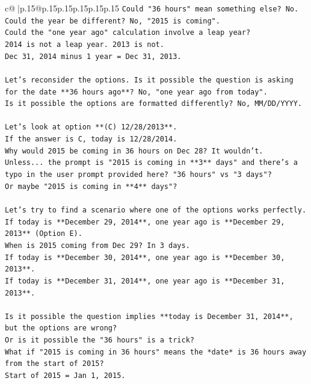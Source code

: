 \documentclass{article}
\begin{document}
{\begin{supertabular}{c@{$\;$}|p{.15\linewidth}@{}p{.15\linewidth}p{.15\linewidth}p{.15\linewidth}p{.15\linewidth}p{.15\linewidth}}
{{{\texttt{Could "36 hours" mean something else? No.} \\
\texttt{Could the year be different? No, "2015 is coming".} \\
\texttt{Could the "one year ago" calculation involve a leap year?} \\
\texttt{2014 is not a leap year. 2013 is not.} \\
\texttt{Dec 31, 2014 minus 1 year = Dec 31, 2013.} \\
\\ 
\texttt{Let's reconsider the options. Is it possible the question is asking for the date **36 hours ago**? No, "one year ago from today".} \\
\texttt{Is it possible the options are formatted differently? No, MM/DD/YYYY.} \\
\\ 
\texttt{Let's look at option **(C) 12/28/2013**.} \\
\texttt{If the answer is C, today is 12/28/2014.} \\
\texttt{Why would 2015 be coming in 36 hours on Dec 28? It wouldn't.} \\
\texttt{Unless... the prompt is "2015 is coming in **3** days" and there's a typo in the user prompt provided here? "36 hours" vs "3 days"?} \\
\texttt{Or maybe "2015 is coming in **4** days"?} \\
\\ 
\texttt{Let's try to find a scenario where one of the options works perfectly.} \\
\texttt{If today is **December 29, 2014**, one year ago is **December 29, 2013** (Option E).} \\
\texttt{When is 2015 coming from Dec 29? In 3 days.} \\
\texttt{If today is **December 30, 2014**, one year ago is **December 30, 2013**.} \\
\texttt{If today is **December 31, 2014**, one year ago is **December 31, 2013**.} \\
\\ 
\texttt{Is it possible the question implies **today is December 31, 2014**, but the options are wrong?} \\
\texttt{Or is it possible the "36 hours" is a trick?} \\
\texttt{What if "2015 is coming in 36 hours" means the *date* is 36 hours away from the start of 2015?} \\
\texttt{Start of 2015 = Jan 1, 2015.} \\
}}}
\end{supertabular}}
\end{document}
